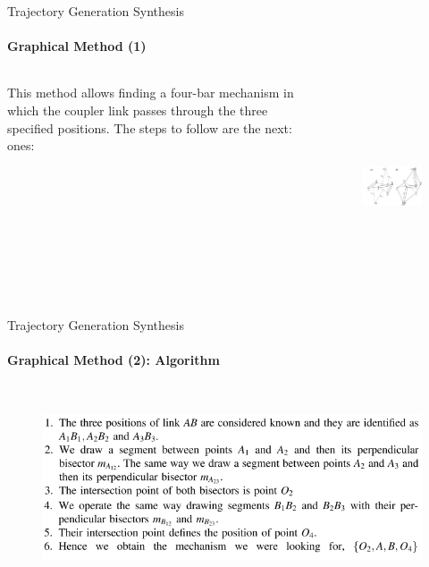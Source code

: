 \documentclass[aspectratio=169]{beamer}
\begin{document}
\begin{frame}[t]{Trajectory Generation Synthesis}
    \framesubtitle{Graphical Method (1)}
    \vspace{-0.5cm}
    \begin{columns}[T,onlytextwidth]
        \begin{column}{0.49\textwidth}
            This method allows ﬁnding a four-bar mechanism in which the coupler link passes through the three speciﬁed positions. The steps to follow are the next:
ones:
        \end{column}
        \begin{column}{0.49\textwidth}
            \begin{figure}[H]
                \centering\includegraphics[height=6cm,width=1\textwidth,keepaspectratio]{traj_gen3.png}
                \label{fig:traj_gen3.png}
            \end{figure}
        \end{column}
    \end{columns}
\end{frame}

\begin{frame}[t]{Trajectory Generation Synthesis}
    \framesubtitle{Graphical Method (2): Algorithm}
    \vspace{-0.7cm}
    \begin{figure}[H]
        \centering\includegraphics[height=6cm,width=1\textwidth,keepaspectratio]{traj_gen4.png}
        \label{fig:traj_gen4.png}
    \end{figure}
\end{frame}
\end{document}
